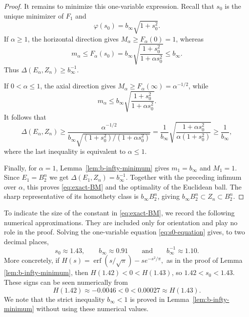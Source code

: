 \documentclass[11pt]{article}
\theoremstyle{definition}
\theoremstyle{remark}
\newtheorem{remark}[theorem]{Remark}
\newcommand{\erf}{\operatorname{erf}}
\begin{document}
\begin{proof}
It remains to minimize this one-variable expression.  Recall that
$s_0$ is the unique minimizer of $F_1$ and
\[
 \varphi(s_0)=b_\infty\sqrt{1+s_0^2}.
\]
If $\alpha\geq1$, the horizontal direction gives
$M_\alpha\geq F_\alpha(0)=1$, whereas
\[
 m_\alpha
 \leq F_\alpha(s_0)
 =b_\infty
   \sqrt{\frac{1+s_0^2}{1+\alpha s_0^2}}
 \leq b_\infty.
\]
Thus $\Delta(E_\alpha,Z_n)\geq b_\infty^{-1}$.

If $0<\alpha\leq1$, the axial direction gives
$M_\alpha\geq F_\alpha(\infty)=\alpha^{-1/2}$, while
\[
 m_\alpha\leq b_\infty
 \sqrt{\frac{1+s_0^2}{1+\alpha s_0^2}}.
\]
It follows that
\begin{equation*}
 \Delta(E_\alpha,Z_n)
 \geq\frac{\alpha^{-1/2}}
{b_\infty\sqrt{(1+s_0^2)/(1+\alpha s_0^2)}}=\frac1{b_\infty}
 \sqrt{\frac{1+\alpha s_0^2}{\alpha(1+s_0^2)}}
 \geq\frac1{b_\infty},
\end{equation*}
where the last inequality is equivalent to $\alpha\leq1$.

Finally, for $\alpha=1$, Lemma~\ref{lem:b-infty-minimum} gives
$m_1=b_\infty$ and $M_1=1$. Since $E_1=B_2^n$ we get $\Delta(E_1,Z_n)=b_\infty^{-1}$. 
Together with the preceding infimum over $\alpha$, this proves
\eqref{eq:exact-BM} and the optimality of the Euclidean ball.  The
sharp representative of its homothety class is
$b_\infty B_2^n$, giving
$
 b_\infty B_2^n\subset Z_n\subset B_2^n.
$
\end{proof}


To indicate the size of the constant in
\eqref{eq:exact-BM}, we record the following numerical
approximations.  They are included only for orientation and play no
role in the proof.  Solving the one-variable equation
\eqref{eq:s0-equation} gives, to two decimal places,
$$
 s_0\approx1.43, \qquad
 b_\infty\approx0.91 \qquad\mbox{and} \qquad
 b_\infty^{-1}\approx1.10.
$$
More concretely, if $
 H(s)=\erf(s/\sqrt\pi)-se^{-s^2/\pi},
$  as in the proof of Lemma \ref{lem:b-infty-minimum},
then $H(1.42)<0<H(1.43)$, so $1.42<s_0<1.43$.  These signs can be
seen numerically from
\[
H(1.42)\approx-0.0046<0<0.00027\approx H(1.43).
\]
 We note that the strict inequality $b_\infty<1$ is proved in
Lemma~\ref{lem:b-infty-minimum} without using these numerical values.
\end{document}
